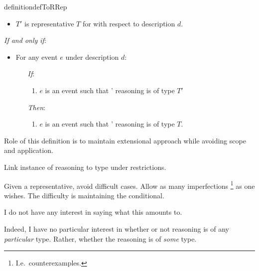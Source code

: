 \begin{note}
  \begin{restatable}{definition}{defToRRep}
    \label{def:type-r}

    \begin{itemize}
    \item
      \(T'\) is representative \(T\) for \vAgent{} with respect to description \(d\).
    \end{itemize}

    \emph{If and only if}:

    \begin{itemize}
    \item
      For any event \(e\) under description \(d\):
      \begin{itemize}
      \item[\emph{If}:]
        \begin{enumerate}
        \item
          \(e\) is an event such that \vAgent{}' reasoning is of type \(T'\)
        \end{enumerate}
      \item[\emph{Then}:]
        \begin{enumerate}
        \item
          \(e\) is an event such that \vAgent{}' reasoning is of type \(T\).
        \end{enumerate}
      \end{itemize}
    \end{itemize}
    \vspace{-\baselineskip}
  \end{restatable}

  Role of this definition is to maintain extensional approach while avoiding scope and application.

  Link instance of reasoning to type under restrictions.
\end{note}

\begin{note}
  Given a representative, avoid difficult cases.
  Allow as many imperfections%
  \footnote{
    I.e.\ counterexamples.
  }
  as one wishes.
  The difficulty is maintaining the conditional.

  I do not have any interest in saying what this amounts to.

  Indeed, I have no particular interest in whether or not reasoning is of any \emph{particular} type.
  Rather, whether the reasoning is of \emph{some} type.
\end{note}

